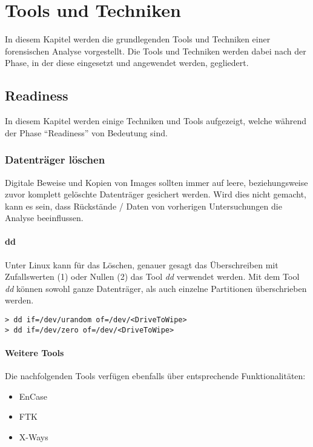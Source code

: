 \chapter{Tools und Techniken} \label{chap:ToolsTechniques}
In diesem Kapitel werden die grundlegenden Tools und Techniken einer forensischen Analyse vorgestellt. Die Tools und Techniken werden dabei nach der Phase, in der diese eingesetzt und angewendet werden, gegliedert.




\section{Readiness}
In diesem Kapitel werden einige Techniken und Tools aufgezeigt, welche während der Phase "`Readiness"' von Bedeutung sind.


\subsection{Datenträger löschen}
Digitale Beweise und Kopien von Images sollten immer auf leere, beziehungsweise zuvor komplett gelöschte Datenträger gesichert werden. Wird dies nicht gemacht, kann es sein, dass Rückstände / Daten von vorherigen Untersuchungen die Analyse beeinflussen.

\subsubsection{dd}
Unter Linux kann für das Löschen, genauer gesagt das Überschreiben mit Zufallswerten (1) oder Nullen (2) das Tool \textit{dd} verwendet werden.
Mit dem Tool \textit{dd} können sowohl ganze Datenträger, als auch einzelne Partitionen überschrieben werden.

\begin{lstlisting}
> dd if=/dev/urandom of=/dev/<DriveToWipe>
> dd if=/dev/zero of=/dev/<DriveToWipe>
\end{lstlisting}

\subsubsection{Weitere Tools}
Die nachfolgenden Tools verfügen ebenfalls über entsprechende Funktionalitäten:
\begin{itemize}
\item EnCase
\item FTK
\item X-Ways
\end{itemize}




